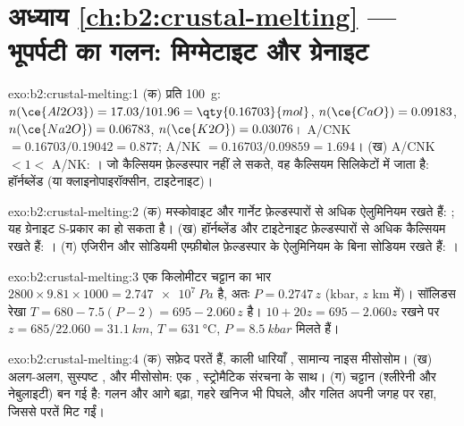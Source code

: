 \section*{अध्याय \ref{ch:b2:crustal-melting} --- भूपर्पटी का गलन: मिग्मेटाइट और ग्रेनाइट}

\begin{solution}{exo:b2:crustal-melting:1}
(क) प्रति \qty{100}{\gram}: $n(\ce{Al2O3}) = 17.03/101.96 = \qty{0.16703}{mol}$,
$n(\ce{CaO}) = 0.09183$, $n(\ce{Na2O}) = 0.06783$, $n(\ce{K2O}) = 0.03076$।
A/CNK $= 0.16703/0.19042 = 0.877$; A/NK $= 0.16703/0.09859 = 1.694$।
(ख) A/CNK $< 1 <$ A/NK: । जो कैल्सियम फ़ेल्डस्पार नहीं ले सकते, वह
कैल्सियम सिलिकेटों में जाता है: हॉर्नब्लेंड (या क्लाइनोपाइरॉक्सीन, टाइटेनाइट)।
\end{solution}

\begin{solution}{exo:b2:crustal-melting:2}
(क) मस्कोवाइट और गार्नेट फ़ेल्डस्पारों से अधिक ऐलुमिनियम रखते हैं: ; यह ग्रेनाइट
S-प्रकार का हो सकता है। (ख) हॉर्नब्लेंड और टाइटेनाइट फ़ेल्डस्पारों से अधिक कैल्सियम रखते हैं:
। (ग) एजिरीन और सोडियमी एम्फ़ीबोल फ़ेल्डस्पार के ऐलुमिनियम के बिना
सोडियम रखते हैं: ।
\end{solution}

\begin{solution}{exo:b2:crustal-melting:3}
एक किलोमीटर चट्टान का भार $2800\times9.81\times1000 = \qty{2.747e7}{Pa}$ है, अतः
$P = 0.2747\,z$ (\unit{kbar}, $z$ \unit{km} में)। सॉलिडस रेखा $T = 680 - 7.5(P -
2) = 695 - 2.060\,z$ है। $10 + 20z = 695 - 2.060z$ रखने पर $z = 685/22.060 =
\qty{31.1}{km}$, $T = \qty{631}{\celsius}$, $P = \qty{8.5}{kbar}$ मिलते हैं।
\end{solution}

\begin{solution}{exo:b2:crustal-melting:4}
(क) सफ़ेद परतें  हैं, काली धारियाँ , सामान्य नाइस
मीसोसोम। (ख) अलग-अलग, सुस्पष्ट ,  और मीसोसोम: एक ,
स्ट्रोमैटिक संरचना के साथ। (ग) चट्टान  (श्लीरेनी और नेबुलाइटी) बन गई है:
गलन और आगे बढ़ा, गहरे खनिज भी पिघले, और गलित अपनी जगह पर रहा,
जिससे परतें मिट गईं।
\end{solution}

